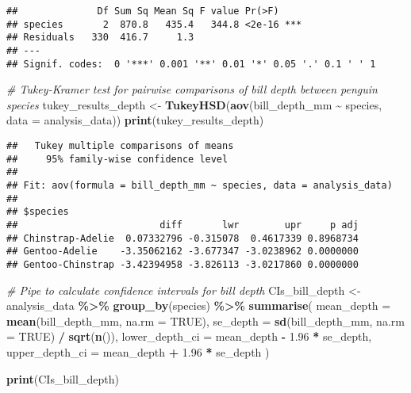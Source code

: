 \documentclass[
]{article}
\newenvironment{Shaded}{\begin{snugshade}}{\end{snugshade}}
\newcommand{\AttributeTok}[1]{\textcolor[rgb]{0.13,0.29,0.53}{#1}}
\newcommand{\CommentTok}[1]{\textcolor[rgb]{0.56,0.35,0.01}{\textit{#1}}}
\newcommand{\ConstantTok}[1]{\textcolor[rgb]{0.56,0.35,0.01}{#1}}
\newcommand{\FloatTok}[1]{\textcolor[rgb]{0.00,0.00,0.81}{#1}}
\newcommand{\FunctionTok}[1]{\textcolor[rgb]{0.13,0.29,0.53}{\textbf{#1}}}
\newcommand{\NormalTok}[1]{#1}
\newcommand{\OtherTok}[1]{\textcolor[rgb]{0.56,0.35,0.01}{#1}}
\newcommand{\SpecialCharTok}[1]{\textcolor[rgb]{0.81,0.36,0.00}{\textbf{#1}}}
\begin{document}
\begin{verbatim}
##              Df Sum Sq Mean Sq F value Pr(>F)    
## species       2  870.8   435.4   344.8 <2e-16 ***
## Residuals   330  416.7     1.3                   
## ---
## Signif. codes:  0 '***' 0.001 '**' 0.01 '*' 0.05 '.' 0.1 ' ' 1
\end{verbatim}

\begin{Shaded}
\begin{Highlighting}[]
\CommentTok{\# Tukey{-}Kramer test for pairwise comparisons of bill depth between penguin species}
\NormalTok{tukey\_results\_depth }\OtherTok{\textless{}{-}} \FunctionTok{TukeyHSD}\NormalTok{(}\FunctionTok{aov}\NormalTok{(bill\_depth\_mm }\SpecialCharTok{\textasciitilde{}}\NormalTok{ species, }\AttributeTok{data =}\NormalTok{ analysis\_data))}
\FunctionTok{print}\NormalTok{(tukey\_results\_depth)}
\end{Highlighting}
\end{Shaded}

\begin{verbatim}
##   Tukey multiple comparisons of means
##     95% family-wise confidence level
## 
## Fit: aov(formula = bill_depth_mm ~ species, data = analysis_data)
## 
## $species
##                         diff       lwr        upr     p adj
## Chinstrap-Adelie  0.07332796 -0.315078  0.4617339 0.8968734
## Gentoo-Adelie    -3.35062162 -3.677347 -3.0238962 0.0000000
## Gentoo-Chinstrap -3.42394958 -3.826113 -3.0217860 0.0000000
\end{verbatim}

\begin{Shaded}
\begin{Highlighting}[]
\CommentTok{\# Pipe to calculate confidence intervals for bill depth}
\NormalTok{CIs\_bill\_depth }\OtherTok{\textless{}{-}}\NormalTok{ analysis\_data }\SpecialCharTok{\%\textgreater{}\%}
  \FunctionTok{group\_by}\NormalTok{(species) }\SpecialCharTok{\%\textgreater{}\%}
  \FunctionTok{summarise}\NormalTok{(}
    \AttributeTok{mean\_depth =} \FunctionTok{mean}\NormalTok{(bill\_depth\_mm, }\AttributeTok{na.rm =} \ConstantTok{TRUE}\NormalTok{),}
    \AttributeTok{se\_depth =} \FunctionTok{sd}\NormalTok{(bill\_depth\_mm, }\AttributeTok{na.rm =} \ConstantTok{TRUE}\NormalTok{) }\SpecialCharTok{/} \FunctionTok{sqrt}\NormalTok{(}\FunctionTok{n}\NormalTok{()),}
    \AttributeTok{lower\_depth\_ci =}\NormalTok{ mean\_depth }\SpecialCharTok{{-}} \FloatTok{1.96} \SpecialCharTok{*}\NormalTok{ se\_depth,}
    \AttributeTok{upper\_depth\_ci =}\NormalTok{ mean\_depth }\SpecialCharTok{+} \FloatTok{1.96} \SpecialCharTok{*}\NormalTok{ se\_depth}
\NormalTok{  )}

\FunctionTok{print}\NormalTok{(CIs\_bill\_depth)}
\end{Highlighting}
\end{Shaded}
\end{document}
